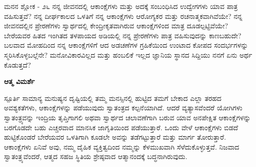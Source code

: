 \newpage
\begin{mananam}{\mananamfont \large ಮನನ ಶ್ಲೋಕ - ೨೬}
\footnotesize \mananamtext ನನ್ನ ಜೀವನದಲ್ಲಿ ಆಕಾಂಕ್ಷೆಗಳು ಮತ್ತು ಅದಕ್ಕೆ ಸಂಬಂಧಿಸಿದ ಉದ್ವೇಗಗಳು ಯಾವ ಪಾತ್ರ ವಹಿಸುತ್ತವೆ? ನನ್ನ ದೀರ್ಘಕಾಲದ ಒಳತಿಗೆ ನನ್ನ ಆಕಾಂಕ್ಷೆಗಳು ಆರೋಗ್ಯಕರ ಮತ್ತು ರಚನಾತ್ಮಕವಾಗಿವೆಯೇ? ನನ್ನ ಜೀವನದಲ್ಲಿನ ಪ್ರೇರಣೆಗಳು ಸ್ವಾರ್ಥದಲ್ಲಿ ಕೇಂದ್ರೀಕೃತವಾಗಿರುವ ಆಕಾಂಕ್ಷೆಗಳಿಂದ ಮಾತ್ರ ದೂಡಲ್ಪಟ್ಟಿವೆಯೇ? ಬೇರೆಯವರ ಹಿತದ ಇಂಗಿತದ ತಳಪಾಯದ ಅಡಿಯಲ್ಲಿ ನನ್ನ ಪ್ರೇರಣೆಗಳು ಪಾತ್ರ ವಹಿಸುವುದನ್ನು ಕಾಣಬಹುದೇ? ಬಲವಾದ ಮೋಹದಿಂದ ನನ್ನ ಆಕಾಂಕ್ಷೆಗಳಿಗೆ ಆದ ಅಡಚಣೆಗಳ ಗ್ರಹಿಕೆಯಿಂದ ಉಂಟಾದ ಕೋಪದ ಸಂದರ್ಭಗಳನ್ನು ಸ್ಮರಿಸಿಕೊಳ್ಳಬಲ್ಲೆನೇ? ಮನೋವಿಕಾರವಿಲ್ಲದ ಮತ್ತು ಹಂಬಲಿಕೆ ಇಲ್ಲದ ಜ್ಞಾನಿಯ ಸ್ಥಾನದ ಸಿದ್ದಿಯು ನನಗೆ ಏನು ಅರ್ಥ ಕೊಡುತ್ತದೆ?
\end{mananam}
\WritingHand\enspace\textbf{ಆತ್ಮ ವಿಮರ್ಶೆ}\\
\begin{inspiration}{\mananamfont \large ಸ್ಪೂರ್ತಿ}
\ssmall \mananamtext ಸಾಮಾನ್ಯ ಮನುಷ್ಯನ ದೃಷ್ಟಿಯಲ್ಲಿ ತಮ್ಮ ಮನಸ್ಸಿನಲ್ಲಿ ಹುಟ್ಟಿದ ತಮಗೆ ಬೇಕಾದ ಎಲ್ಲಾ ತರಹದ ಅವಶ್ಯಕತೆಗಳು, ಆಕಾಂಕ್ಷೆಗಳನ್ನು ಪಡೆಯುವುದು ಸ್ವಾತಂತ್ರದ ಕಲ್ಪನೆಯಾಗಿದೆ. ಆದರೆ ವ್ಯತ್ಯಾಸವೆಂದರೆ ಯೋಗಿಗಳು ಸ್ವಾತಂತ್ರ್ಯವನ್ನು ಇಂದ್ರಿಯ ತೃಪ್ತಿಗಾಗಲಿ ಅಥವಾ ಸ್ವಾರ್ಥದ ಚಲಾವಣೆಗಾಗಿ ಬರುವ ಯಾವ ಅನಪೇಕ್ಷಿತ ಆಕಾಂಕ್ಷೆಗಳನ್ನು ಬರಗೊಡದೇ ಬಹು ಎಚ್ಚರವಾದ ಮಾನಸಿಕ ಜಾಗೃತಿಯಿಂದ ಪಡೆಯುತ್ತಾರೆ. ಒಂದು ವೇಳೆ ಆಕಾಂಕ್ಷೆಗಳು ಬಿಡದೆ ಹುಟ್ಟಿಕೊಂಡರೆ ಬೇರೆಯವರ ಒಳತಿಗಾಗಿ ಕೂಡಲೇ ಅವನ್ನು ತಡೆಗಟ್ಟುತ್ತಾರೆ ಮತ್ತು ಮಾರ್ಗ ತೋರುತ್ತಾರೆ. ಆಕಾಂಕ್ಷೆಗಳು ಏನಿವೆ ಅವು, ನಮ್ಮ ದೈಹಿಕ ವ್ಯಕ್ತಿತ್ವದಿಂದ ನಮ್ಮನ್ನು ಕೆಳಮುಖವಾಗಿ ಸೆಳೆದುಕೊಳ್ಳುತ್ತವೆ. ನಿಜವಾದ ಸ್ವಾತಂತ್ರ್ಯವೆಂದರೆ, ಆತ್ಮದ ಸಹಜ ಸ್ಥಿತಿಯ  ಶ್ರೇಷ್ಠವಾದ  ಆತ್ಮಾನಂದಕ್ಕೆ   ಬದ್ಧನಾಗಿರುವುದು.
\end{inspiration}
